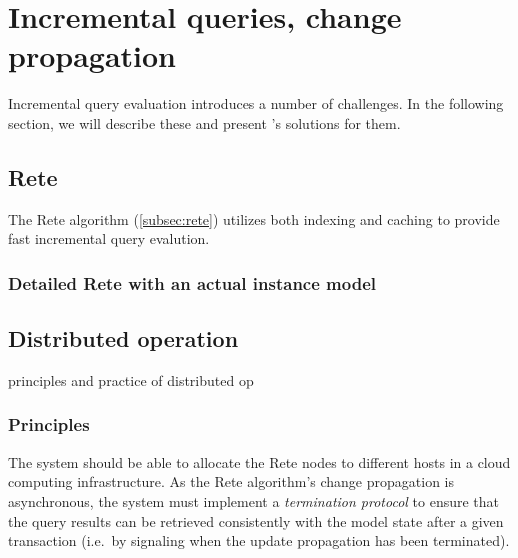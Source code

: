 \section{Incremental queries, change propagation}
\label{sec:incrementality}

Incremental query evaluation introduces a number of challenges. In the following section, we will describe these and present \iqd{}'s solutions for them.

\subsection{Rete}

The Rete algorithm (\autoref{subsec:rete}) utilizes both indexing and caching to provide fast incremental query evalution.  

\subsubsection{Detailed Rete with an actual instance model}











\subsection{Distributed operation}

principles and practice of distributed op


\subsubsection{Principles}

The system should be able to allocate the Rete nodes to different hosts in a cloud computing infrastructure. As the Rete algorithm's change propagation is asynchronous, the system must implement a \emph{termination protocol} to ensure that the query results can be retrieved consistently with the model state after a given transaction (i.e.\ by signaling when the update propagation has been terminated).


